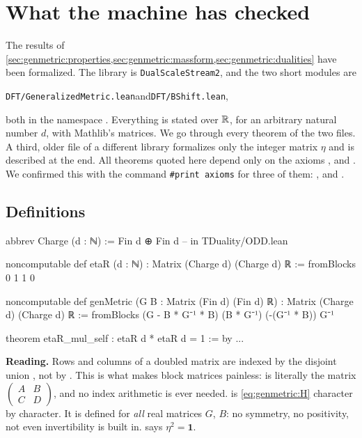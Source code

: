 \section{What the machine has checked}\label{sec:genmetric:lean}

The results of \cref{sec:genmetric:properties,sec:genmetric:massform,sec:genmetric:dualities}
have been formalized. The library is \texttt{DualScaleStream2}, and the two short modules
are
\begin{center}
\texttt{DFT/GeneralizedMetric.lean}\qquad and\qquad\texttt{DFT/BShift.lean},
\end{center}
both in the namespace . Everything is stated over $\mathbb{R}$, for an arbitrary natural number
$d$, with Mathlib's matrices. We go through every theorem of the two files. A third, older
file of a different library formalizes only the integer matrix $\eta$ and is described at
the end. All theorems quoted here depend only on the axioms ,
 and . We confirmed this with the command
\texttt{\#print axioms} for three of them: ,
 and .

\subsection{Definitions}

\begin{leanbox}
\begin{leancode}
abbrev Charge (d : ℕ) := Fin d ⊕ Fin d          -- in TDuality/ODD.lean

noncomputable def etaR (d : ℕ) : Matrix (Charge d) (Charge d) ℝ :=
  fromBlocks 0 1 1 0

noncomputable def genMetric (G B : Matrix (Fin d) (Fin d) ℝ) :
    Matrix (Charge d) (Charge d) ℝ :=
  fromBlocks (G - B * G⁻¹ * B) (B * G⁻¹) (-(G⁻¹ * B)) G⁻¹

theorem etaR_mul_self : etaR d * etaR d = 1 := by ...
\end{leancode}
\textbf{Reading.} Rows and columns of a doubled matrix are indexed by the disjoint union
, not by . This is what makes block matrices painless:
 is literally the matrix
$\left(\begin{smallmatrix}A&B\\C&D\end{smallmatrix}\right)$, and no index arithmetic is
ever needed.  is \eqref{eq:genmetric:H} character by character. It is
defined for \emph{all} real matrices $G$, $B$: no symmetry, no positivity, not even
invertibility is built in.  says $\eta^2=\mathbf 1$.
\end{leanbox}

